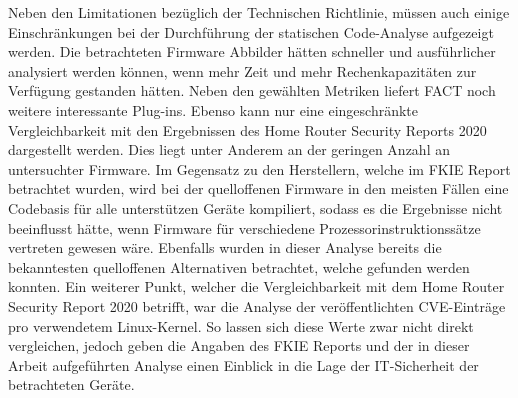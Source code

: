\documentclass[a4paper]{book}
\begin{document}
\begin{large}
\begin{onehalfspace}
	Neben den Limitationen bezüglich der Technischen Richtlinie, müssen auch einige Einschränkungen bei der Durchführung der statischen Code-Analyse aufgezeigt werden. Die betrachteten Firmware Abbilder hätten schneller und ausführlicher analysiert werden können, wenn mehr Zeit und mehr Rechenkapazitäten zur Verfügung gestanden hätten. Neben den gewählten Metriken liefert FACT noch weitere interessante Plug-ins. Ebenso kann nur eine eingeschränkte Vergleichbarkeit mit den Ergebnissen des \glqq Home Router Security Reports 2020\grqq{} dargestellt werden. Dies liegt unter Anderem an der geringen Anzahl an untersuchter Firmware. Im Gegensatz zu den Herstellern, welche im FKIE Report betrachtet wurden, wird bei der quelloffenen Firmware in den meisten Fällen eine Codebasis für alle unterstützen Geräte kompiliert, sodass es die Ergebnisse nicht beeinflusst hätte, wenn Firmware für verschiedene Prozessorinstruktionssätze vertreten gewesen wäre. Ebenfalls wurden in dieser Analyse bereits die bekanntesten quelloffenen Alternativen betrachtet, welche gefunden werden konnten. Ein weiterer Punkt, welcher die Vergleichbarkeit mit dem \glqq Home Router Security Report 2020\grqq{} betrifft, war die Analyse der veröffentlichten CVE-Einträge pro verwendetem Linux-Kernel. So lassen sich diese Werte zwar nicht direkt vergleichen, jedoch geben die Angaben des FKIE Reports und der in dieser Arbeit aufgeführten Analyse einen Einblick in die Lage der IT-Sicherheit der betrachteten Geräte.
\end{onehalfspace}



\end{large}
\end{document}
